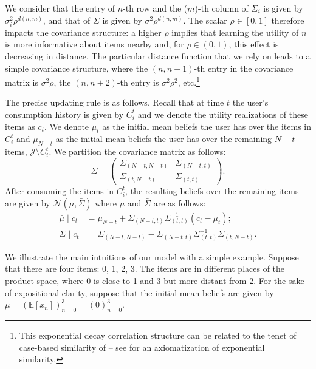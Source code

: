 \documentclass[sigconf]{acmart}
\newcommand{\xhdr}[1]{\vspace{1mm} \noindent{\bf #1}}
\begin{document}
We consider that the entry of $n$-th row and the ($m$)-th column of $\Sigma_i$ is given by $\sigma_i^2 \rho^{d(n,m)}$, and that of $\Sigma$ is given by $\sigma^2 \rho^{d(n,m)}$. The scalar $\rho \in [0,1]$ therefore impacts the covariance structure: a higher $\rho$ implies that learning the utility of $n$ is more informative about items nearby and, for $\rho \in (0,1)$, this effect is decreasing in distance. The particular distance function that we rely on leads to a simple covariance structure, where the $(n,n+1)$-th entry in the covariance matrix is $\sigma^{2} \rho$, the $(n,n+2)$-th entry is $\sigma^{2} \rho^2$, etc.\footnote{This exponential decay correlation structure can be related to the tenet of case-based similarity of \cite{gilboa1995case} -- see \cite{billot2008axiomatization} for an axiomatization of exponential similarity.}


The precise updating rule is as follows. Recall that at time $t$ the user's consumption history is given by $C_{i}^{t}$ and we denote the utility realizations of these items as $c_t$. We denote $\mu_t$ as the initial mean beliefs the user has over the items in $C_{i}^{t}$ and $\mu_{N-t}$ as the initial mean beliefs the user has over the remaining $N-t$ items, $\mathcal{J} \setminus C_{i}^{t}$. We partition the covariance matrix as follows:
\[ \Sigma =  \left( \begin{array}{cc}
\Sigma_{(N-t, N-t)} & \Sigma_{(N-t,t)} \\
\Sigma_{(t,N-t)} & \Sigma_{(t,t)}
\end{array} \right).
\]
After consuming the items in $C_{i}^{t}$, the resulting beliefs over the remaining items are given by $\mathcal{N}(\bar{\mu}, \bar{\Sigma})$ where $\bar{\mu}$ and $\bar{\Sigma}$ are as follows:
\begin{align*}
\bar{\mu} \mid c_t &= \mu_{N-t} + \Sigma_{(N-t,t)} \Sigma_{(t,t)}^{-1}(c_t - \mu_t); \\
\bar{\Sigma} \mid c_t &= \Sigma_{(N-t,N-t)} - \Sigma_{(N-t,t)} \Sigma_{(t,t)}^{-1} \Sigma_{(t,N-t)}.
\end{align*}

\xhdr{An Illustrative Example.} We illustrate the main intuitions of our model with a simple example. Suppose that there are four items: 0, 1, 2, 3. The items are in different places of the product space, where 0 is close to 1 and 3 but more distant from 2. For the sake of expositional clarity, suppose that the initial mean beliefs are given by $\mu=(\mathbb E[x_n])_{n=0}^3=(0)_{n=0}^3$.
\end{document}
